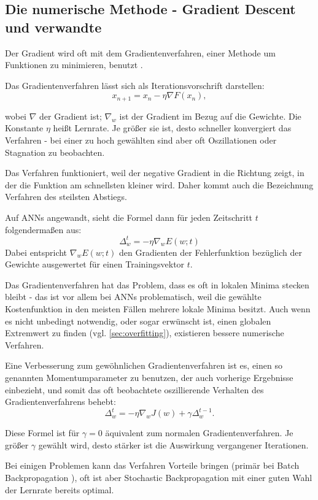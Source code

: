 \subsection{Die numerische Methode - Gradient Descent und verwandte}

Der Gradient wird oft mit dem Gradientenverfahren, einer Methode um Funktionen zu minimieren, benutzt \cite{bishop1995neural,bengio2012practical}.

Das Gradientenverfahren lässt sich als Iterationsvorschrift darstellen:
\begin{equation}
x_{n+1}=x_n- \eta  \nabla F(x_n), 
\end{equation}

wobei $\nabla$ der Gradient ist; $\nabla_w$ ist der Gradient im Bezug auf die Gewichte. 
Die Konstante $\eta$ heißt Lernrate. Je größer sie ist, desto schneller konvergiert das Verfahren - bei einer zu hoch gewählten sind aber oft Oszillationen oder Stagnation zu beobachten. 

Das Verfahren funktioniert, weil der negative Gradient in die Richtung zeigt, in der die Funktion am schnellsten kleiner wird. Daher kommt auch die Bezeichnung Verfahren des steilsten Abstiegs.

Auf ANNs angewandt, sieht die Formel dann für jeden Zeitschritt $t$ folgendermaßen aus:
\begin{equation}
  \Delta_w^t = - \eta  \nabla_w E(w;t)
\end{equation}
Dabei entspricht $\nabla_w E(w;t)$ den Gradienten der Fehlerfunktion bezüglich der Gewichte ausgewertet für einen Trainingsvektor $t$.

Das Gradientenverfahren hat das Problem, dass es oft in lokalen Minima stecken bleibt - das ist vor allem bei ANNs problematisch, weil die gewählte Kostenfunktion in den meisten Fällen mehrere lokale Minima besitzt. Auch wenn es nicht unbedingt notwendig, oder sogar erwünscht ist, einen globalen Extremwert zu finden (vgl. \ref{sec:overfitting}), existieren bessere numerische Verfahren. 

Eine Verbesserung zum gewöhnlichen Gradientenverfahren ist es, einen so genannten Momentumparameter zu benutzen, der auch vorherige Ergebnisse einbezieht, und somit das oft beobachtete oszillierende Verhalten des Gradientenverfahrens behebt:
\begin{equation}
 \Delta_w^t = - \eta  \nabla_w J(w) + \gamma \Delta_w^{t-1}.
\end{equation}

Diese Formel ist für $\gamma = 0$ äquivalent zum normalen Gradientenverfahren. Je größer $\gamma$ gewählt wird, desto stärker ist die Auswirkung vergangener Iterationen. 

Bei einigen Problemen kann das Verfahren Vorteile bringen (primär bei Batch Backpropagation \cite{lecunefficient}), oft ist aber Stochastic Backpropagation mit einer guten Wahl der Lernrate bereits optimal\cite{bengio2012practical}.
